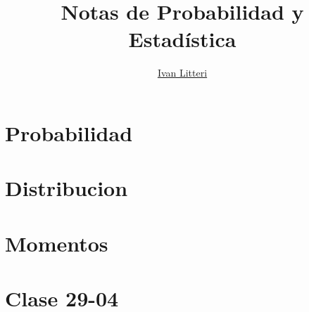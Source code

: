 \documentclass[hidelinks]{article}
\title{Notas de Probabilidad y Estadística}
\author{\href{https://github.com/ilitteri}{Ivan Litteri}}
\date{}
\begin{document}
\maketitle
\tableofcontents
\clearpage

\section{Probabilidad}

\clearpage

\section{Distribucion}

\clearpage

\section{Momentos}

\clearpage

% 

\section{Clase 29-04}

\clearpage

\printindex
\end{document}
